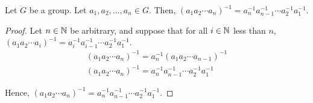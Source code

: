     \begin{thm}
        Let \(G\) be a group. Let \(a_1, a_2, \ldots, a_n\in G\). Then,
        \((a_1a_2\cdots a_n)^{-1} = a_{n}^{-1} a_{n - 1}^{-1}\cdots a_{2}^{-1}a_{1}^{-1}\).
    \end{thm}

    \begin{proof}
        Let \(n\in \mathbb{N}\) be arbitrary, and suppose that for all \(i\in\mathbb{N}\) less than \(n\), \((a_1a_2\cdots a_i)^{-1} = a_{i}^{-1} a_{i - 1}^{-1}\cdots a_{2}^{-1}a_{1}^{-1}\).
        \begin{align*}
            (a_1a_2\cdots a_n)^{-1} = a_{n}^{-1} (a_1a_2\cdots a_{n - 1})^{-1} \\
            (a_1a_2\cdots a_n)^{-1} = a_{n}^{-1} a_{n - 1}^{-1}\cdots a_{2}^{-1}a_{1}^{-1}
        \end{align*}

        Hence, \((a_1a_2\cdots a_n)^{-1} = a_{n}^{-1} a_{n - 1}^{-1}\cdots a_{2}^{-1}a_{1}^{-1}\).
        \end{proof}
